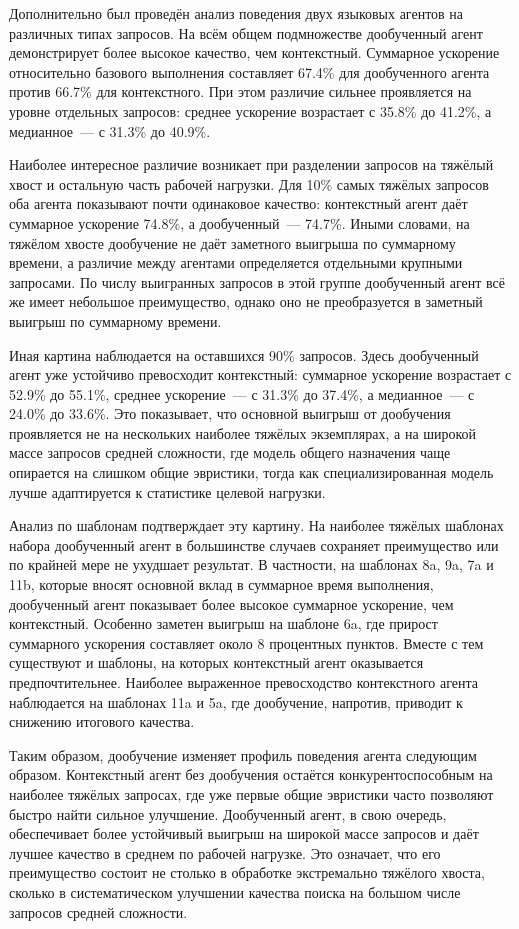 Дополнительно был проведён анализ поведения двух языковых агентов на различных типах запросов. На всём общем подмножестве дообученный агент демонстрирует более высокое качество, чем контекстный. Суммарное ускорение относительно базового выполнения составляет 67.4\% для дообученного агента против 66.7\% для контекстного. При этом различие сильнее проявляется на уровне отдельных запросов: среднее ускорение возрастает с 35.8\% до 41.2\%, а медианное~--- с 31.3\% до 40.9\%.

Наиболее интересное различие возникает при разделении запросов на тяжёлый хвост и остальную часть рабочей нагрузки. Для 10\% самых тяжёлых запросов оба агента показывают почти одинаковое качество: контекстный агент даёт суммарное ускорение 74.8\%, а дообученный~--- 74.7\%. Иными словами, на тяжёлом хвосте дообучение не даёт заметного выигрыша по суммарному времени, а различие между агентами определяется отдельными крупными запросами. По числу выигранных запросов в этой группе дообученный агент всё же имеет небольшое преимущество, однако оно не преобразуется в заметный выигрыш по суммарному времени.

Иная картина наблюдается на оставшихся 90\% запросов. Здесь дообученный агент уже устойчиво превосходит контекстный: суммарное ускорение возрастает с 52.9\% до 55.1\%, среднее ускорение~--- с 31.3\% до 37.4\%, а медианное~--- с 24.0\% до 33.6\%. Это показывает, что основной выигрыш от дообучения проявляется не на нескольких наиболее тяжёлых экземплярах, а на широкой массе запросов средней сложности, где модель общего назначения чаще опирается на слишком общие эвристики, тогда как специализированная модель лучше адаптируется к статистике целевой нагрузки.

Анализ по шаблонам подтверждает эту картину. На наиболее тяжёлых шаблонах набора дообученный агент в большинстве случаев сохраняет преимущество или по крайней мере не ухудшает результат. В частности, на шаблонах 8a, 9a, 7a и 11b, которые вносят основной вклад в суммарное время выполнения, дообученный агент показывает более высокое суммарное ускорение, чем контекстный. Особенно заметен выигрыш на шаблоне 6a, где прирост суммарного ускорения составляет около 8 процентных пунктов. Вместе с тем существуют и шаблоны, на которых контекстный агент оказывается предпочтительнее. Наиболее выраженное превосходство контекстного агента наблюдается на шаблонах 11a и 5a, где дообучение, напротив, приводит к снижению итогового качества.

Таким образом, дообучение изменяет профиль поведения агента следующим образом. Контекстный агент без дообучения остаётся конкурентоспособным на наиболее тяжёлых запросах, где уже первые общие эвристики часто позволяют быстро найти сильное улучшение. Дообученный агент, в свою очередь, обеспечивает более устойчивый выигрыш на широкой массе запросов и даёт лучшее качество в среднем по рабочей нагрузке. Это означает, что его преимущество состоит не столько в обработке экстремально тяжёлого хвоста, сколько в систематическом улучшении качества поиска на большом числе запросов средней сложности.

